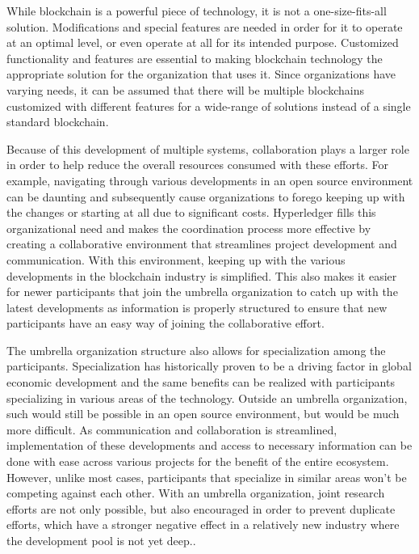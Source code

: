 While blockchain is a powerful piece of technology, it is not a one-size-fits-all solution. Modifications and special features are needed in order for it to operate at an optimal level, or even operate at all for its intended purpose. Customized functionality and features are essential to making blockchain technology the appropriate solution for the organization that uses it. Since organizations have varying needs, it can be assumed that there will be multiple blockchains customized with different features for a wide-range of solutions instead of a single standard blockchain.

Because of this development of multiple systems, collaboration plays a larger role in order to help reduce the overall resources consumed with these efforts. For example, navigating through various developments in an open source environment can be daunting and subsequently cause organizations to forego keeping up with the changes or starting at all due to significant costs. Hyperledger fills this organizational need and makes the coordination process more effective by creating a collaborative environment that streamlines project development and communication. With this environment, keeping up with the various developments in the blockchain industry is simplified. This also makes it easier for newer participants that join the umbrella organization to catch up with the latest developments as information is properly structured to ensure that new participants have an easy way of joining the collaborative effort.

The umbrella organization structure also allows for specialization among the participants. Specialization has historically proven to be a driving factor in global economic development and the same benefits can be realized with participants specializing in various  areas of the technology. Outside an umbrella organization, such would still be possible in an open source environment, but would be much more difficult. As communication and collaboration is streamlined, implementation of these developments and access to necessary information can be done with ease across various projects for the benefit of the entire ecosystem. However, unlike most cases, participants that specialize in similar areas won’t be competing against each other. With an umbrella organization, joint research efforts are not only possible, but also encouraged in order to prevent duplicate efforts, which have a stronger negative effect in a relatively new industry where the development pool is not yet deep.. 

